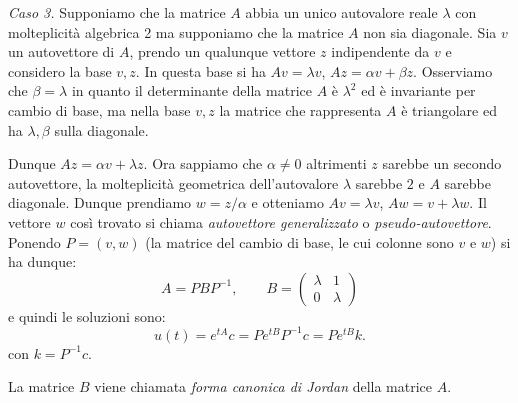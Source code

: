 \documentclass[italian,a4paper]{scrartcl}
\begin{document}
\emph{Caso 3.}
Supponiamo che la matrice $A$ abbia un unico autovalore reale
$\lambda$ con molteplicità algebrica 2 ma supponiamo che la matrice
$A$ non sia diagonale. Sia $v$ un autovettore di $A$,
prendo un qualunque vettore $z$ indipendente da $v$ e considero
la base $v,z$. In questa base si ha $Av = \lambda v$, $Az = \alpha v +
\beta z$. Osserviamo che $\beta = \lambda$ in quanto il determinante
della matrice $A$ è $\lambda^2$ ed è invariante per cambio di
base, ma nella base $v,z$ la matrice che rappresenta $A$ è triangolare
ed ha $\lambda,\beta$ sulla diagonale.

Dunque $Az = \alpha v + \lambda z$. Ora sappiamo
che $\alpha\neq 0$ altrimenti $z$ sarebbe un secondo autovettore,
la molteplicità geometrica dell'autovalore $\lambda$ sarebbe $2$ e $A$
sarebbe diagonale. Dunque
prendiamo $w=z / \alpha$ e otteniamo $Av=\lambda v$, $Aw = v +
\lambda w$. Il vettore $w$ così trovato si chiama \emph{autovettore
  generalizzato} o \emph{pseudo-autovettore}. Ponendo $P=(v,w)$ (la
matrice del cambio di base, le cui colonne sono $v$ e $w$) si ha dunque:
\[
A = P B P^{-1}, \qquad B=\begin{pmatrix}\lambda & 1 \\ 0 & \lambda \end{pmatrix}
\]
e quindi le soluzioni sono:
\[
u(t) = e^{tA}c = P e^{tB}P^{-1}c = P e^{tB}k.
\]
con $k=P^{-1}c$.

La matrice $B$ viene chiamata \emph{forma canonica di Jordan} della matrice $A$.
\end{document}
